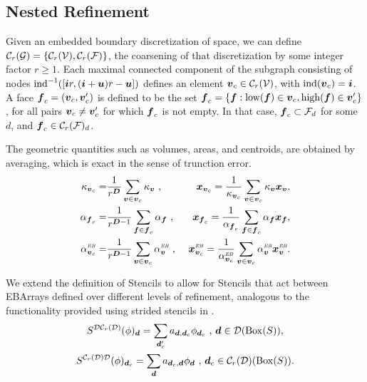 \documentclass[12pt]{article}
\newcommand{\ind}{{\rm{ind}}}
\newcommand{\low}{{\rm{low}}}
\newcommand{\high}{{\rm{high}}}
\newcommand{\vof}{{\mbf{v}}}
\newcommand{\face}{{\mbf{f}}}
\newcommand{\dgen}{{\mbf{d}}}
\newcommand{\VC}{{\mcl{C}_r(\mcl{V})}}
\newcommand{\ebsub}{{\text{\it \tiny EB}}}
\begin{document}
\subsection{Nested Refinement} 

Given an embedded boundary discretization of space, we can define ${\mathcal{C}}_r({\mathcal{G}}) =\{ {\mathcal{C}}_r({\mathcal{V}}),{\mathcal{C}}_r({\mathcal{F}})\}$, the coarsening of that discretization by some integer factor $r \ge 1$. Each maximal connected component of the subgraph consisting of nodes $\ind^{-1}([\mbf{i} r , (\mbf{i} + \mbf{u})r - \mbf{u}] )$ defines an element $\vof_c \in \VC$, with $\ind(\vof_c) = \mbf{i}$. A face $\face_c = (\vof_c , \vof_c')$ is defined to be the set $\face_c = \{\face: \low(\face ) \in \vof_c , \high(\face) \in \vof_c'\}$, for all pairs $\vof_c \neq \vof_c'$ for which $\face_c$ is not empty. In that case, $\face_c \subset \mcl{F}_d$ for some $d$, and $\face_c \in \mcl{C}_r(\mcl{F})_d$.

The geometric quantities such as volumes, areas, and centroids, are obtained by averaging, which is exact in the sense of trunction error. 
\begin{align*}
\kappa_{\vof_c} = & \frac{1}{r^\DIM} \sum \limits_{\vof \in \vof_c} \kappa_\vof \cma &
\mbf{x}_{\vof_c} =  \frac{1}{\kappa_{\vof_c}} \sum \limits_{\vof \in \vof_c} \kappa_\vof \mbf{x}_\vof ,
\\
\alpha_{\face_c} = & \frac{1}{r^{\DIM-1}} \sum \limits_{\face \in \face_c} \alpha_\face \cma & \mbf{x}_{\face_c} =  \frac{1}{\alpha_{\face_c}} \sum \limits_{\face \in \face_c} \alpha_\face \mbf{x}_\face ,
\\
\alpha_{\vof_c}^\ebsub = & \frac{1}{r^{\DIM-1}} \sum \limits_{\vof \in \vof_c} \alpha_\vof^\ebsub \cma & \mbf{x}_{\vof_c}^\ebsub =  \frac{1}{\alpha_{\vof_c}^\ebsub} \sum \limits_{\vof \in \vof_c} \alpha_\vof^\ebsub \mbf{x}_\vof^\ebsub .
\end{align*}

We extend the definition of Stencils to allow for Stencils that act between EBArrays defined over different levels of refinement, analogous to the functionality provided using strided stencils in .
\begin{gather*}
S^{\mcl{D}\mcl{C}_r(\mcl{D})}(\phi)_{\dgen} =\sum \limits_{\dgen_c '} a_{\dgen,\dgen_c} \phi_{\dgen_c  } \cma \dgen \in \mcl{D}(\MBox(S)), 
\\ S^{\mcl{C}_r(\mcl{D}) \mcl{D}}(\phi)_{\dgen_c} = \sum \limits_{\dgen} a_{\dgen_c,\dgen} \phi_{\dgen} \cma \dgen_c \in \mcl{C}_r(\mcl{D})(\MBox(S)).
\end{gather*}
\end{document}
